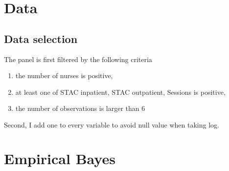\documentclass[12pt]{article}
\begin{document}




\newpage


\appendix
\section{Data}
\subsection{Data selection}

The panel is first filtered by the following criteria
\begin{enumerate}
    \item the number of nurses is positive,
    \item at least one of STAC inpatient, STAC outpatient, Sessions is positive,
    \item the number of observations is larger than 6
\end{enumerate}
Second, I add one to every variable to avoid null value when taking log.

\section{Empirical Bayes}
\end{document}
